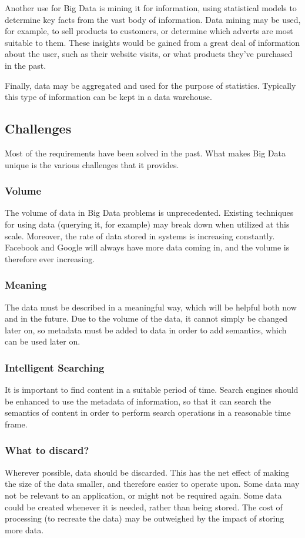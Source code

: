 \documentclass{article}
\begin{document}
Another use for Big Data is mining it for information, using statistical models to determine key facts from the vast body of information. Data mining may be used, for example, to sell products to customers, or determine which adverts are most suitable to them. These insights would be gained from a great deal of information about the user, such as their website visits, or what products they've purchased in the past.

Finally, data may be aggregated and used for the purpose of statistics. Typically this type of information can be kept in a data warehouse.

\subsection{Challenges}
Most of the requirements have been solved in the past. What makes Big Data unique is the various challenges that it provides.

\subsubsection{Volume}
The volume of data in Big Data problems is unprecedented. Existing techniques for using data (querying it, for example) may break down when utilized at this scale. Moreover, the rate of data stored in systems is increasing constantly. Facebook and Google will always have more data coming in, and the volume is therefore ever increasing.

\subsubsection{Meaning}
The data must be described in a meaningful way, which will be helpful both now and in the future. Due to the volume of the data, it cannot simply be changed later on, so metadata must be added to data in order to add semantics, which can be used later on.

\subsubsection{Intelligent Searching}
It is important to find content in a suitable period of time. Search engines should be enhanced to use the metadata of information, so that it can search the semantics of content in order to perform search operations in a reasonable time frame.

\subsubsection{What to discard?}
Wherever possible, data should be discarded. This has the net effect of making the size of the data smaller, and therefore easier to operate upon. Some data may not be relevant to an application, or might not be required again. Some data could be created whenever it is needed, rather than being stored. The cost of processing (to recreate the data) may be outweighed by the impact of storing more data.
\end{document}
